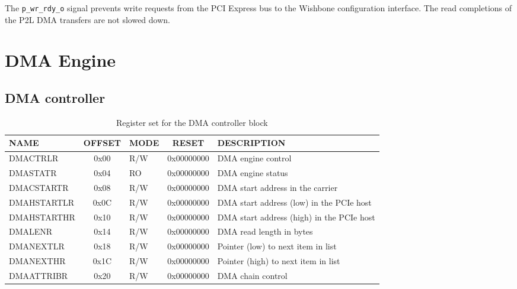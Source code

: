 \documentclass[10pt,a4paper]{cerndoc}
\begin{document}
  The \verb+p_wr_rdy_o+ signal prevents write requests from the PCI Express bus to the Wishbone configuration interface. The read completions of the P2L DMA transfers are not slowed down.
  
  
  
  

\section{DMA Engine}

\subsection{DMA controller}

\begin{table}[htbp]
  \centering
  \begin{tabularx}{\textwidth}{|l|c|l|c|X|}                                                   \hline
    \textbf{NAME}  & \textbf{OFFSET} & \textbf{MODE} & \textbf{RESET} & \textbf{DESCRIPTION}  \\ \hline \hline
    DMACTRLR       & 0x00 & R/W & 0x00000000 & DMA engine control                                       \\ \hline
    DMASTATR       & 0x04 & RO  & 0x00000000 & DMA engine status                                              \\ \hline
    DMACSTARTR     & 0x08 & R/W & 0x00000000 & DMA start address in the carrier                               \\ \hline
    DMAHSTARTLR    & 0x0C & R/W & 0x00000000 & DMA start address (low) in the PCIe host                       \\ \hline
    DMAHSTARTHR    & 0x10 & R/W & 0x00000000 & DMA start address (high) in the PCIe host                      \\ \hline
    DMALENR        & 0x14 & R/W & 0x00000000 & DMA read length in bytes                                       \\ \hline
    DMANEXTLR      & 0x18 & R/W & 0x00000000 & Pointer (low) to next item in list                             \\ \hline
    DMANEXTHR      & 0x1C & R/W & 0x00000000 & Pointer (high) to next item in list                            \\ \hline
    DMAATTRIBR     & 0x20 & R/W & 0x00000000 & DMA chain control                                              \\ \hline
  \end{tabularx}
  \caption{Register set for the DMA controller block}
  \label{tab:dma_control}
\end{table}
  
\end{document}
